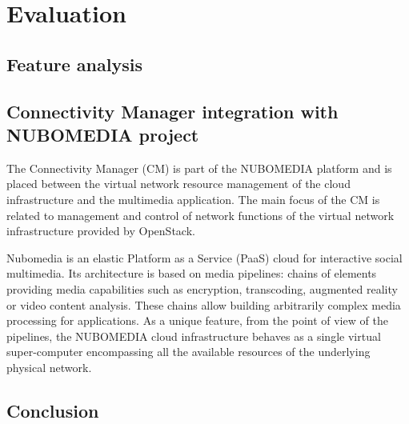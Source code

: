 \chapter{Evaluation}

\section{Feature analysis}

\section{Connectivity Manager integration with NUBOMEDIA project}


The Connectivity Manager (CM) is part of the NUBOMEDIA platform and is placed between the virtual network resource management of the cloud infrastructure and the
multimedia application. The main focus of the CM is related to management and control of network functions of the virtual network infrastructure provided by OpenStack.

Nubomedia is an elastic Platform as a Service (PaaS) cloud for interactive social multimedia. Its architecture is based on media pipelines: chains of elements providing media capabilities such as encryption, transcoding, augmented reality or video content analysis. These chains allow building arbitrarily complex media processing for applications. As a unique feature, from the point of view of the pipelines, the NUBOMEDIA cloud infrastructure behaves as a single virtual super-computer encompassing all the available resources of the underlying physical network.

\section{Conclusion}